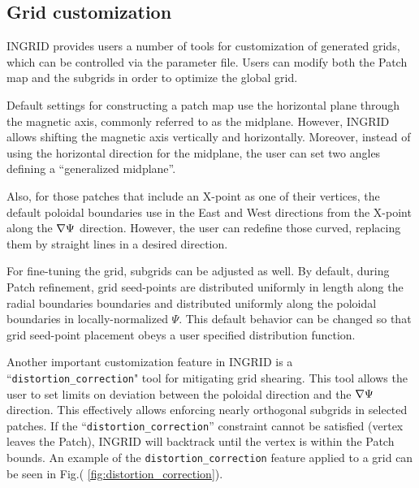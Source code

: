 \subsection{Grid customization}

INGRID provides users a number of tools for customization of generated
grids, which can be controlled via the parameter file. Users can
modify both the Patch map and the subgrids in order to optimize the
global grid.

Default settings for constructing a patch map use the horizontal plane
through the magnetic axis, commonly referred to as the midplane.
However, INGRID allows shifting the magnetic axis vertically and
horizontally. Moreover, instead of using the horizontal direction for
the midplane, the user can set two angles defining a ``generalized
midplane''.

Also, for those patches that include an X-point as one of their
vertices, the default poloidal boundaries use in the East and West
directions from the X-point along the $\nabla \Psi$ direction. However,
the user can redefine those curved, replacing them by straight lines
in a desired direction.

For fine-tuning the grid, subgrids can be adjusted as well. By
default, during Patch refinement, grid seed-points are distributed
uniformly in length along the radial boundaries boundaries and
distributed uniformly along the poloidal boundaries in
locally-normalized $\Psi$. This default behavior can be changed so
that grid seed-point placement obeys a user specified distribution
function.

Another important customization feature in INGRID is a
``\texttt{distortion\_correction}" tool for mitigating grid
shearing. This tool allows the user to set limits on deviation between
the poloidal direction and the $\nabla \Psi$ direction. This
effectively allows enforcing nearly orthogonal subgrids in selected
patches. If the ``\texttt{distortion\_correction}'' constraint cannot
be satisfied (vertex leaves the Patch), INGRID will backtrack until
the vertex is within the Patch bounds. An example of the
\texttt{distortion\_correction} feature applied to a grid can be seen
in Fig.( \ref{fig:distortion_correction}).
